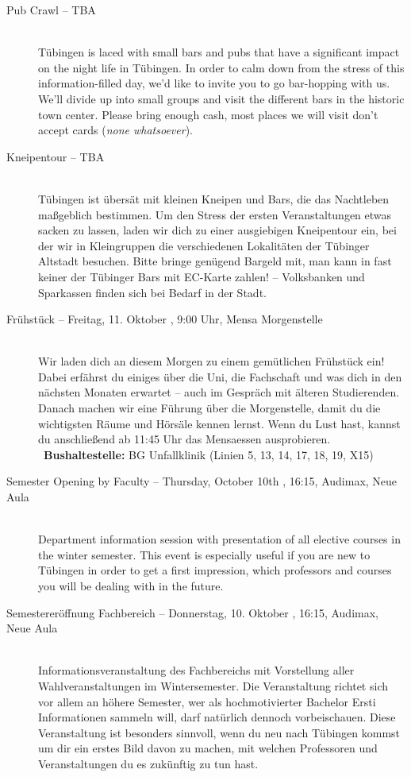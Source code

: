 \begin{description}
\ifml
	\item[Pub Crawl -- TBA]~\\
	Tübingen is laced with small bars and pubs that have a significant impact on the night life in Tübingen.
	In order to calm down from the stress of this information-filled day, we'd like to invite you to go bar-hopping with us.
	We'll divide up into small groups and visit the different bars in the historic town center.
	Please bring enough cash, most places we will visit don't accept cards (\emph{none whatsoever}).
\else
	\item[Kneipentour -- TBA]~\\
	Tübingen ist übersät mit kleinen Kneipen und Bars, die das Nachtleben maßgeblich bestimmen.
	Um den Stress der ersten Veranstaltungen etwas sacken zu lassen, laden wir dich zu einer ausgiebigen Kneipentour ein,
	bei der wir in Kleingruppen die verschiedenen Lokalitäten der Tübinger Altstadt besuchen.
	Bitte bringe genügend Bargeld mit, man kann in fast keiner der Tübinger Bars mit EC-Karte zahlen! -- Volksbanken und Sparkassen finden sich bei Bedarf in der Stadt.
\fi

\ifbachelor \pagebreak  \fi

 \ifbachelor
  	\item[Frühstück -- Freitag, 11. Oktober \YEAR, 9:00 Uhr, Mensa Morgenstelle]\ \\
  	Wir laden dich an diesem Morgen zu einem gemütlichen Frühstück ein! Dabei erfährst du einiges über die Uni, die Fachschaft und was dich in den nächsten Monaten erwartet -- auch im Gespräch mit älteren Studierenden.
  	Danach machen wir eine Führung über die Morgenstelle, damit du die wichtigsten Räume und Hörsäle kennen lernst.
  	Wenn du Lust hast, kannst du anschließend ab 11:45 Uhr das Mensaessen ausprobieren.\\
  	~\textbf{Bushaltestelle:} BG Unfallklinik (Linien 5, 13, 14, 17, 18, 19, X15)
 \fi

 \ifml
 	\item[Semester Opening by Faculty -- Thursday, October 10th \YEAR, 16:15, Audimax, Neue Aula]\ \\
 	Department information session with presentation of all elective courses in the winter semester.
 	This event is especially useful if you are new to Tübingen in order to get a first impression,
 	which professors and courses you will be dealing with in the future.
 \else
 	\item[Semestereröffnung Fachbereich -- Donnerstag, 10. Oktober \YEAR, 16:15, Audimax, Neue Aula]\ \\
 	Informationsveranstaltung des Fachbereichs mit Vorstellung aller
 	Wahlveranstaltungen im Wintersemester. 
 	\ifbachelor
 	Die Veranstaltung richtet sich vor allem an höhere Semester, 
 	wer als hochmotivierter Bachelor Ersti Informationen sammeln will, darf natürlich dennoch vorbeischauen.
 	\else
 	Diese Veranstaltung ist besonders sinnvoll, wenn du neu nach Tübingen kommst um dir ein erstes Bild davon zu machen,
 	mit welchen Professoren und Veranstaltungen du es zukünftig zu tun hast.
 	\fi
 \fi


\end{description}
